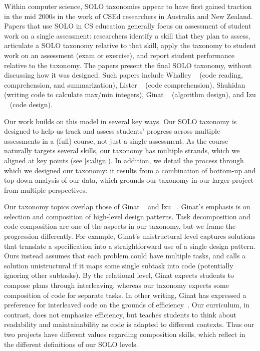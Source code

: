 Within computer science, SOLO
taxonomies appear to have first gained traction in the mid 2000s
in the work of CSEd researchers in Australia and New Zealand.
Papers that use SOLO in CS education generally focus on
assessment of student work on a single assessment: researchers identify a
skill that they plan to assess, articulate a SOLO taxonomy relative to
that skill, apply the taxonomy to student work on an assessment (exam
or exercise), and report student performance relative to the
taxonomy. The papers present the final SOLO taxonomy, without
discussing how it was designed. Such papers include Whalley
\etal~\cite{whalley-solo-reading06} (code reading,
comprehension, and summarization), Lister \etal~\cite{lister_not_2006} (code comprehension), Shuhidan \etal~\cite{shuhidan_taxonomic_2009} (writing code to calculate max/min integers), Ginat
\etal~\cite{ginat-solo-algorithmic15} (algorithm design), and Izu
\etal~\cite{izu-code-design-solo16} (code design).

Our work builds on this model in several key ways. Our SOLO
taxonomy is designed to help us track and assess students' progress
across multiple assessments in a (full) course, not just a single
assessment.  As the course naturally targets several skills, our
taxonomy has multiple strands, which we aligned at key points (see
\cref{s:align}). In addition, we detail the process through which we designed our
taxonomy: it results from a combination of bottom-up and top-down analysis
of our data, which grounds our taxonomy in our
larger project from multiple perspectives.

Our taxonomy topics overlap
those of Ginat \etal~\cite{ginat-solo-algorithmic15} and Izu
\etal~\cite{izu-code-design-solo16}.  Ginat's emphasis is on selection
and composition of high-level design patterns.  Task decomposition and
code composition are one of the aspects in our taxonomy, but we frame
the progression differently.  For example, Ginat's unistructural level
captures solutions that translate a specification into a
straightforward use of a single design pattern.  Ours instead assumes
that each problem could have multiple tasks, and calls a solution
unistructural if it maps some single subtask into code (potentially
ignoring other subtasks).  By the relational level, Ginat expects
students to compose plans through interleaving, whereas our taxonomy
expects some composition of code for separate tasks.  In other
writing, Ginat has expressed a preference for interleaved code on the
grounds of efficiency~\cite{muller-ginat-pattern07}.  Our curriculum,
in contrast, does not emphasize efficiency, but teaches students to
think about readability and maintainability as code is adapted to
different contexts.  Thus our two projects have different values
regarding composition skills, which reflect in the different
definitions of our SOLO levels.

